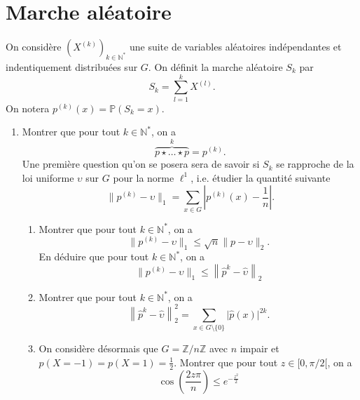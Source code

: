 \documentclass{article}[a4paper]
\newcommand{\N}{\mathbb{N}}
\newcommand{\Z}{\mathbb{Z}}
\newcommand{\norm}[1]{\lVert#1\rVert}
\renewcommand{\P}{\mathbb{P}}
\begin{document}
\section{Marche aléatoire}
On considère \((X^{(k)})_{k\in \N^*}\) une suite de variables aléatoires indépendantes
et indentiquement distribuées sur \(G\). On définit la marche aléatoire \(S_k\) par 
\begin{equation*}
    S_k = \sum_{l=1}^k X^{(l)}.
\end{equation*}
On notera \(p^{(k)}(x) = \P(S_k = x)\).
\begin{enumerate}
    \item Montrer que pour tout \(k\in \N^*\), on a
    \begin{equation*}
        \overbrace{p\star \dots \star p}^k = p^{(k)}.
    \end{equation*}
    Une première question qu'on se posera sera de savoir si \(S_k\) se rapproche
    de la loi uniforme \(\upsilon\) sur \(G\) pour la norme \(\ell^1\), i.e. étudier la 
    quantité suivante 
    \begin{equation*}
        \norm{p^{(k)} - \upsilon}_1 = \sum_{x\in G} \left\lvert p^{(k)}(x) - \frac{1}{n}\right\rvert.
    \end{equation*}
    \begin{enumerate}
        \item Montrer que pour tout \(k\in \N^*\), on a 
        \begin{equation*}
            \norm{p^{(k)}-\upsilon}_1 \le \sqrt{n} \norm{p-\upsilon}_2.
        \end{equation*}
        En déduire que pour tout \(k\in \N^*\), on a
        \begin{equation*}
            \norm{p^{(k)}-\upsilon}_1 \le \left\|\hat{p}^k - \widehat{\upsilon}\right\|_2
        \end{equation*}
        \item Montrer que pour tout \(k\in \N^*\), on a 
        \begin{equation*}
            \left\|\hat{p}^k - \widehat{\upsilon}\right\|_2^2 = \sum_{x\in G\setminus\{0\}} \lvert \hat{p}(x)\rvert^{2k}.
        \end{equation*} 
        \item On considère désormais que \(G = \Z/n\Z\) avec \(n\) impair et \(p(X=-1) = p(X=1) = \frac{1}{2}\).
        Montrer que pour tout \(z\in [0,\pi/2[\), on a 
        \begin{equation*}
            \cos\left(\frac{2z\pi}{n}\right) \le e^{-\frac{z^2}{2}}

\end{equation*}
\end{enumerate}
\end{enumerate}
\end{document}
